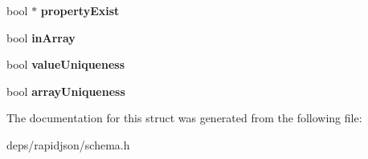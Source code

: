 \begin{DoxyCompactItemize}
\item 
bool $\ast$ {\bfseries property\+Exist}\hypertarget{structinternal_1_1_schema_validation_context_a06a4f92f3336efcf85d7cd22d97bbd84}{}\label{structinternal_1_1_schema_validation_context_a06a4f92f3336efcf85d7cd22d97bbd84}

\item 
bool {\bfseries in\+Array}\hypertarget{structinternal_1_1_schema_validation_context_af18fc4ef754e8a52732e152854f06341}{}\label{structinternal_1_1_schema_validation_context_af18fc4ef754e8a52732e152854f06341}

\item 
bool {\bfseries value\+Uniqueness}\hypertarget{structinternal_1_1_schema_validation_context_a23e93ca88653ed878e3ddf290fc6bd9f}{}\label{structinternal_1_1_schema_validation_context_a23e93ca88653ed878e3ddf290fc6bd9f}

\item 
bool {\bfseries array\+Uniqueness}\hypertarget{structinternal_1_1_schema_validation_context_a0864c5e8155fe0064f17e8dcb31d93c7}{}\label{structinternal_1_1_schema_validation_context_a0864c5e8155fe0064f17e8dcb31d93c7}

\end{DoxyCompactItemize}


The documentation for this struct was generated from the following file\+:\begin{DoxyCompactItemize}
\item 
deps/rapidjson/schema.\+h\end{DoxyCompactItemize}
